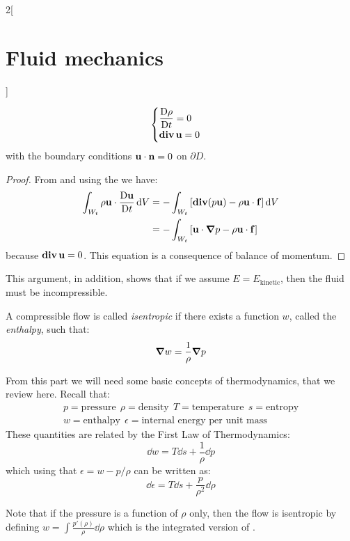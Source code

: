 \documentclass[../../../main_physics.tex]{subfiles}
\begin{document}
\begin{multicols}{2}[\section{Fluid mechanics}]
\begin{theorem}
$$\begin{cases}
        \displaystyle\frac{\mathrm{D}\rho}{\mathrm{D}t}=0                             \\
        \displaystyle\operatorname{\boldsymbol{\mathrm{div}}}\boldsymbol{\mathrm{u}}=0
      \end{cases}
    $$
    with the boundary conditions $\boldsymbol{\mathrm{u}}\cdot\boldsymbol{\mathrm{n}} = 0$ on $\partial D$.
  \end{theorem}
  \begin{proof}
    From  and using the  we have:
    \begin{align*}
      \int_{W_t}\rho\boldsymbol{\mathrm{u}}\cdot\frac{\mathrm{D}\boldsymbol{\mathrm{u}}}{\mathrm{D}t}\dd{V} & =-\int_{W_t}\left[\operatorname{\boldsymbol{\mathrm{div}}}(p\boldsymbol{\mathrm{u}})-\rho \boldsymbol{\mathrm{u}}\cdot\boldsymbol{\mathrm{f}}\right]\dd{V}   \\
                                                       & = -\int_{W_t}\left[\boldsymbol{\mathrm{u}}\cdot\grad p - \rho \boldsymbol{\mathrm{u}}\cdot\boldsymbol{\mathrm{f}}\right]
    \end{align*}
    because $\operatorname{\boldsymbol{\mathrm{div}}}\boldsymbol{\mathrm{u}}=0$. This equation is a consequence of balance of momentum.
  \end{proof}
  \begin{remark}
    This argument, in addition, shows that if we assume $E = E_\mathrm{kinetic}$, then the fluid must be incompressible.
  \end{remark}
  \begin{definition}
    A compressible flow is called \emph{isentropic} if there exists a function $w$, called the \emph{enthalpy}, such that:
    $$
      \grad w=\frac{1}{\rho}\grad p
    $$
  \end{definition}
  \begin{remark}
    From this part we will need some basic concepts of thermodynamics, that we review here. Recall that:
    \begin{gather*}
      p=\text{pressure} \ \ \rho=\text{density} \ \ T=\text{temperature} \ \ s=\text{entropy} \\
      w=\text{enthalpy} \ \ \epsilon=\text{internal energy per unit mass}
    \end{gather*}
    These quantities are related by the First Law of Thermodynamics:
    \begin{equation}\label{FLM:firstlawthermo}
      \dd{w}=T\dd{s}+\frac{1}{\rho}\dd{p}
    \end{equation}
    which using that $\epsilon=w-p/\rho$ can be written as:
    $$
      \dd{\epsilon}=T\dd{s}+\frac{p}{\rho^2}\dd{\rho}
    $$
  \end{remark}
  \begin{remark}
    Note that if the pressure is a function of $\rho$ only, then the flow is isentropic by defining $w=\int \frac{p'(\rho)}{\rho} \dd{\rho}$ which is the integrated version of .

\end{remark}
\end{multicols}
\end{document}

